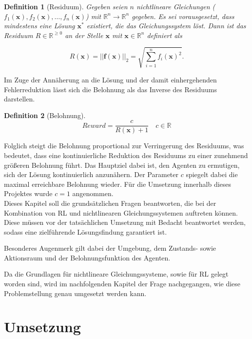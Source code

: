 \documentclass{article}
\theoremstyle{newline}
\newtheorem{definition}{Definition}[section]
\begin{document}
\begin{onehalfspace}
\begin{definition}[Residuum]
	Gegeben seien $n$ nichtlineare Gleichungen ($f_1(\mathbf{x}), f_2(\mathbf{x}), \dots, f_n(\mathbf{x})$) mit $\mathbb{R}^n \rightarrow \mathbb{R}^n$ gegeben. Es sei vorausgesetzt, dass mindestens eine Lösung $\mathbf{x}^{\ast}$ existiert, die das Gleichungssystem löst. Dann ist das Residuum $R \in \mathbb{R}^{\geq 0}$ an der Stelle $\mathbf{x}$ mit $\mathbf{x} \in \mathbb{R}^n$ definiert als
	
	\begin{equation}
		R(\mathbf{x}) = ||\mathbf{f}(\mathbf{x})||_2 = \sqrt{ \sum_{i=1}^{n} f_i(\mathbf{x})^2 }.
	\end{equation}
\end{definition}

Im Zuge der Annäherung an die Lösung und der damit einhergehenden Fehlerreduktion lässt sich die Belohnung als das Inverse des Residuums darstellen.

\begin{definition}[Belohnung]
	\begin{equation}
		Reward = \dfrac{c}{R(\mathbf{x}) + 1} \quad c \in \mathbb{R}
	\end{equation}
\end{definition}

Folglich steigt die Belohnung proportional zur Verringerung des Residuums, was bedeutet, dass eine kontinuierliche Reduktion des Residuums zu einer zunehmend größeren Belohnung führt. Das Hauptziel dabei ist, den Agenten zu ermutigen, sich der Lösung kontinuierlich anzunähern. Der Parameter $c$ spiegelt dabei die maximal erreichbare Belohnung wieder. Für die Umsetzung innerhalb dieses Projektes wurde $c=1$ angenommen.
\\

Dieses Kapitel soll die grundsätzlichen Fragen beantworten, die bei der Kombination von RL und nichtlinearen Gleichungssystemen auftreten können. Diese müssen vor der tatsächlichen Umsetzung mit Bedacht beantwortet werden, sodass eine zielführende Lösungsfindung garantiert ist.

Besonderes Augenmerk gilt dabei der Umgebung, dem Zustands- sowie Aktionsraum und der Belohnungsfunktion des Agenten.

Da die Grundlagen für nichtlineare Gleichungssysteme, sowie für RL gelegt worden sind, wird im nachfolgenden Kapitel der Frage nachgegangen, wie diese Problemstellung genau umgesetzt werden kann.

\section{Umsetzung}


\end{onehalfspace}
\end{document}
